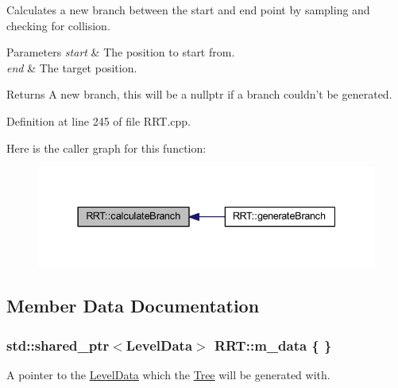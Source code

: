 Calculates a new branch between the start and end point by sampling and checking for collision. 


\begin{DoxyParams}{Parameters}
{\em start} & The position to start from. \\
\hline
{\em end} & The target position. \\
\hline
\end{DoxyParams}
\begin{DoxyReturn}{Returns}
A new branch, this will be a nullptr if a branch couldn't be generated. 
\end{DoxyReturn}


Definition at line 245 of file R\+R\+T.\+cpp.



Here is the caller graph for this function\+:
\nopagebreak
\begin{figure}[H]
\begin{center}
\leavevmode
\includegraphics[width=337pt]{classRRT_a1393c4dc3be5c4d66756dbfb8b75abee_icgraph}
\end{center}
\end{figure}




\subsection{Member Data Documentation}
\hypertarget{classRRT_a4990cccae7cd2160f1fa6e970242365a}{
\subsubsection[{m\+\_\+data}]{\setlength{\rightskip}{0pt plus 5cm}std\+::shared\+\_\+ptr$<${\bf Level\+Data}$>$ R\+R\+T\+::m\+\_\+data \{ \}\hspace{0.3cm}{\ttfamily [private]}}}\label{classRRT_a4990cccae7cd2160f1fa6e970242365a}


A pointer to the \hyperlink{classLevelData}{Level\+Data} which the \hyperlink{classTree}{Tree} will be generated with. 



